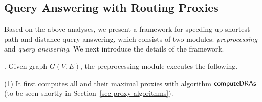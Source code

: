\subsection{Query Answering with Routing Proxies}
\label{subsec-proxy-query}




 Based on the above analyses, we present a framework for speeding-up shortest  path and distance query answering, which consists of two modules: {\em preprocessing} and {\em query answering}.
 We next introduce the details of the framework.

. Given graph $G(V, E)$, the preprocessing module executes the following.

\sstab (1) It first computes all \dras and their maximal proxies with algorithm ${\mathsf{computeDRAs}}$ (to be seen shortly in Section~\ref{sec-proxy-algorithms}).

